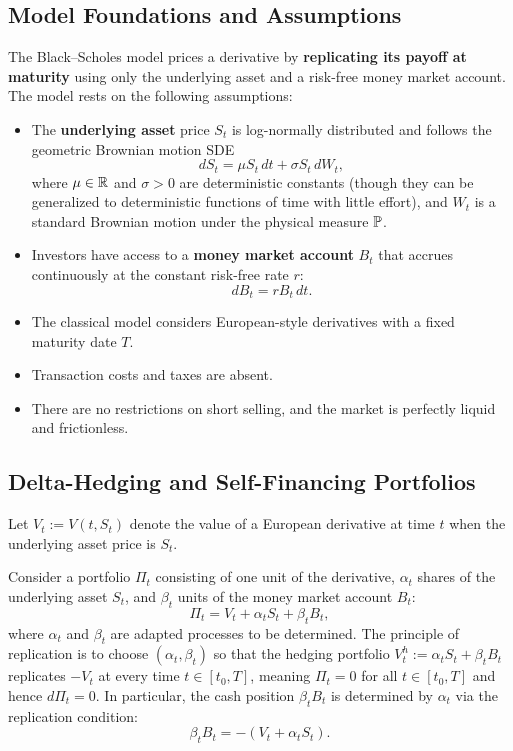 \subsection{Model Foundations and Assumptions}
The Black--Scholes model prices a derivative by \textbf{replicating its payoff at maturity} using only the underlying asset and a risk-free money market account. The model rests on the following assumptions:
\begin{itemize}
    \item The \textbf{underlying asset} price $S_t$ is log-normally distributed and follows the geometric Brownian motion SDE
    \[
        dS_t = \mu S_t\,dt + \sigma S_t\,dW_t,
    \]
    where $\mu \in \mathbb{R}$ and $\sigma > 0$ are deterministic constants (though they can be generalized to deterministic functions of time with little effort), and $W_t$ is a standard Brownian motion under the physical measure $\mathbb{P}$.
    \item Investors have access to a \textbf{money market account} $B_t$ that accrues continuously at the constant risk-free rate $r$:
    \[
        dB_t = r B_t\,dt.
    \]
    \item The classical model considers European-style derivatives with a fixed maturity date $T$.
    \item Transaction costs and taxes are absent.
    \item There are no restrictions on short selling, and the market is perfectly liquid and frictionless.
\end{itemize}

\subsection{Delta-Hedging and Self-Financing Portfolios}
Let $V_t := V(t, S_t)$ denote the value of a European derivative at time $t$ when the underlying asset price is $S_t$.

Consider a portfolio $\Pi_t$ consisting of one unit of the derivative, $\alpha_t$ shares of the underlying asset $S_t$, and $\beta_t$ units of the money market account $B_t$:
\[
    \Pi_t = V_t + \alpha_t S_t + \beta_t B_t,
\]
where $\alpha_t$ and $\beta_t$ are adapted processes to be determined. The principle of replication is to choose $(\alpha_t, \beta_t)$ so that the hedging portfolio $V_t^h := \alpha_t S_t + \beta_t B_t$ replicates $-V_t$ at every time $t \in [t_0, T]$, meaning $\Pi_t = 0$ for all $t \in [t_0, T]$ and hence $d\Pi_t = 0$. In particular, the cash position $\beta_t B_t$ is determined by $\alpha_t$ via the replication condition:
\begin{equation}
    \label{eq:ch04-replication}
    \beta_t B_t = -(V_t + \alpha_t S_t).
\end{equation}

